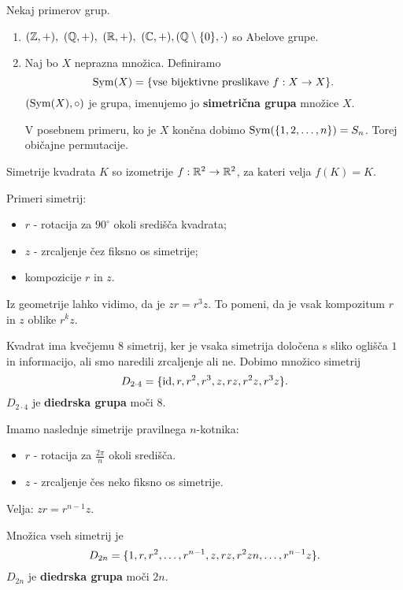 \begin{zgled}
    Nekaj primerov grup.
    \begin{enumerate}
        \item $(\mathbb{Z}, +), \ (\mathbb{Q}, +), \ (\mathbb{R}, +), \ (\mathbb{C}, +), (\mathbb{Q} \setminus \{0\}, \cdot)$ so Abelove grupe.
        \item Naj bo $X$ neprazna množica. Definiramo 
        $$\operatorname{Sym}(X) = \{\text{vse bijektivne preslikave } f: X \to X\}.$$ $(\operatorname{Sym}(X), \circ)$ 
        je grupa, imenujemo jo \textbf{simetrična grupa} množice $X$.        
        
        V posebnem primeru, ko je $X$ končna dobimo $\operatorname{Sym}(\{1, 2, \ldots, n\}) = S_n$. Torej običajne permutacije.
    \end{enumerate}
\end{zgled}

\begin{zgled}
    Simetrije kvadrata $K$ so izometrije $f: \mathbb{R}^2 \to \mathbb{R}^2$, za kateri velja $f(K) = K$. 
    
    Primeri simetrij: 
    \begin{itemize}
        \item $r$ - rotacija za $90^{\circ}$ okoli središča kvadrata;
        \item $z$ - zrcaljenje čez fiksno os simetrije;
        \item kompozicije $r$ in $z$.
    \end{itemize}
    
    Iz geometrije lahko vidimo, da je $zr = r^3z$. To pomeni, da je vsak kompozitum $r$ in $z$ oblike $r^kz$.
    
    Kvadrat ima kvečjemu $8$ simetrij, ker je vsaka simetrija določena s sliko oglišča $1$ in informacijo, ali smo naredili zrcaljenje ali ne. Dobimo množico simetrij $$D_{2 \cdot 4} = \{\operatorname{id}, r, r^2, r^3, z, rz, r^2z, r^3z\}.$$ $D_{2\cdot 4}$ je \textbf{diedrska grupa} moči $8$.
\end{zgled}

\begin{zgled}
    Imamo naslednje simetrije pravilnega $n$-kotnika:
    \begin{itemize}
        \item $r$ - rotacija za $\frac{2 \pi}{n}$ okoli središča.
        \item $z$ - zrcaljenje čes neko fiksno os simetrije.
    \end{itemize}
    Velja: $zr = r^{n-1}z$. 
    
    Množica vseh simetrij je $$D_{2n} = \{1, r, r^2, \ldots, r^{n-1}, z, rz, r^2zn, \ldots, r^{n-1}z\}.$$
    $D_{2n}$ je \textbf{diedrska grupa} moči $2n$.
\end{zgled}

